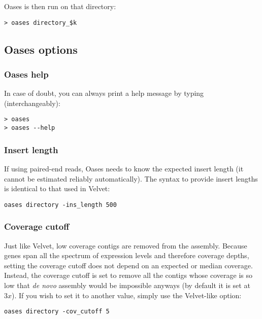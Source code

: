 \documentclass[12pt]{article}
\begin{document}
Oases is then run on that directory:

\begin{verbatim}
> oases directory_$k
\end{verbatim}

\subsection{Oases options}

\subsubsection{Oases help}

In case of doubt, you can always print a help message by typing (interchangeably):

\begin{verbatim}
> oases
> oases --help
\end{verbatim}

\subsubsection{Insert length}\label{insert}

If using paired-end reads, Oases needs to know the expected insert length (it cannot be estimated reliably automatically). The syntax to provide insert lengths is identical to that used in Velvet:

\begin{verbatim}
oases directory -ins_length 500
\end{verbatim}

\subsubsection{Coverage cutoff}

Just like Velvet, low coverage contigs are removed from the assembly. Because genes span all the spectrum of expression levels and therefore coverage depths, setting the coverage cutoff does not depend on an expected or median coverage. Instead, the coverage cutoff is set to remove all the contigs whose coverage is so low that \emph{de novo} assembly would be impossible anyways (by default it is set at $3x$). If you wish to set it to another value, simply use the Velvet-like option:

\begin{verbatim}
oases directory -cov_cutoff 5
\end{verbatim}
\end{document}
